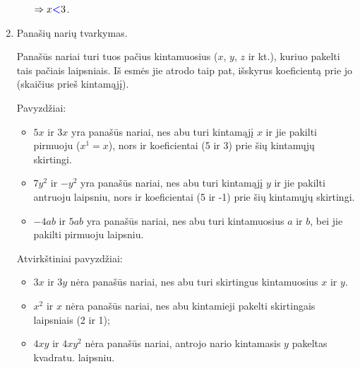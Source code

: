 \documentclass[a4paper]{article}
\begin{document}
\begin{enumerate}
\begin{enumerate}[label*=\arabic*.]
                        $\Rightarrow x\boldsymbol{\textcolor{blue}{<}}3$.

            \end{enumerate}

      \item Panašių narių tvarkymas.

            Panašūs nariai turi tuos pačius kintamuosius ($x$, $y$, $z$
            ir kt.), kuriuo pakelti tais pačiais laipsniais.
            Iš esmės jie atrodo taip pat, išskyrus koeficientą prie jo
            (skaičius prieš kintamąjį).

            Pavyzdžiai:
            \begin{itemize}
                  \item $5x$ ir $3x$ yra panašūs nariai, nes abu turi kintamąjį
                        $x$
                        ir jie pakilti pirmuoju ($x^{1}=x$), nors ir
                        koeficientai
                        (5 ir 3) prie šių
                        kintamųjų skirtingi.
                  \item $7y^{2}$ ir $-y^2$ yra panašūs nariai, nes abu turi
                        kintamąjį $y$ ir jie pakilti antruoju laipsniu, nors ir
                        koeficientai (5 ir
                        -1) prie šių kintamųjų skirtingi.
                  \item $-4ab$ ir $5ab$ yra panašūs nariai, nes abu turi
                        kintamuosius $a$ ir $b$, bei jie pakilti pirmuoju
                        laipsniu.
            \end{itemize}

            Atvirkštiniai pavyzdžiai:
            \begin{itemize}
                  \item $3x$ ir $3y$ nėra panašūs nariai, nes abu turi
                        skirtingus kintamuosius
                        $x$ ir $y$.
                  \item $x^{2}$ ir $x$ nėra panašūs nariai, nes abu kintamieji
                        pakelti skirtingais laipsniais (2 ir 1);
                  \item $4xy$ ir $4xy^{2}$ nėra panašūs nariai, antrojo nario
                        kintamasis $y$ pakeltas kvadratu.
                        laipsniu.
            \end{itemize}

            \begin{enumerate}[label*=\arabic*.]


\end{enumerate}
\end{enumerate}
\end{document}
